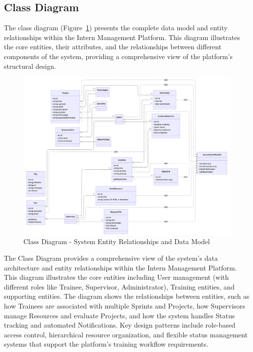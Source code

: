 \subsection{Class Diagram}

\noindent
The class diagram (Figure~\ref{fig:class_diagram}) presents the complete data model and entity relationships within the Intern Management Platform. This diagram illustrates the core entities, their attributes, and the relationships between different components of the system, providing a comprehensive view of the platform's structural design.

\begin{figure}[H]
    \centering
    \includegraphics[angle=90,width=\textwidth,height=\textheight,keepaspectratio]{images/classfinalss.png}
    \caption{Class Diagram - System Entity Relationships and Data Model}
    \label{fig:class_diagram}
\end{figure}

\noindent
The Class Diagram provides a comprehensive view of the system's data architecture and entity relationships within the Intern Management Platform. This diagram illustrates the core entities including User management (with different roles like Trainee, Supervisor, Administrator), Training entities, and supporting entities. The diagram shows the relationships between entities, such as how Trainees are associated with multiple Sprints and Projects, how Supervisors manage Resources and evaluate Projects, and how the system handles Status tracking and automated Notifications. Key design patterns include role-based access control, hierarchical resource organization, and flexible status management systems that support the platform's training workflow requirements.

